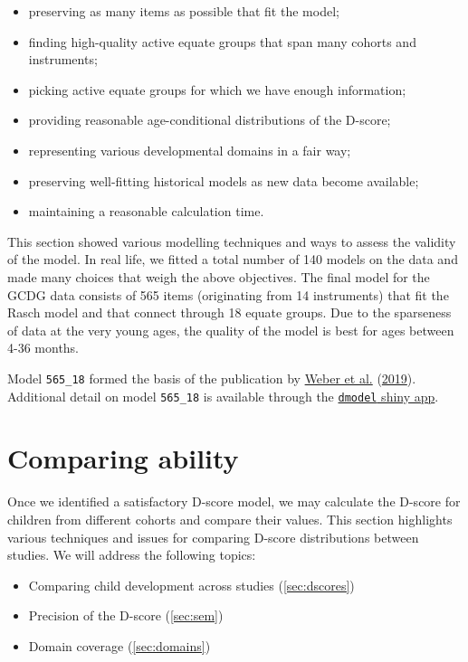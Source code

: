 \documentclass[
]{book}
\providecommand{\tightlist}{%
  \setlength{\itemsep}{0pt}\setlength{\parskip}{0pt}}
\begin{document}
\begin{itemize}
\tightlist
\item
  preserving as many items as possible that fit the model;
\item
  finding high-quality active equate groups that span many cohorts and instruments;
\item
  picking active equate groups for which we have enough information;
\item
  providing reasonable age-conditional distributions of the D-score;
\item
  representing various developmental domains in a fair way;
\item
  preserving well-fitting historical models as new data become available;
\item
  maintaining a reasonable calculation time.
\end{itemize}

This section showed various modelling techniques and ways to assess the validity of the model. In real life, we fitted a total number of 140 models on the data and made many choices that weigh the above objectives. The final model for the GCDG data consists of 565 items (originating from 14 instruments) that fit the Rasch model and that connect through 18 equate groups. Due to the sparseness of data at the very young ages, the quality of the model is best for ages between 4-36 months.

Model \texttt{565\_18} formed the basis of the publication by \protect\hyperlink{ref-Weber2019}{Weber et al.} (\protect\hyperlink{ref-Weber2019}{2019}). Additional detail on model \texttt{565\_18} is available through the \href{https://tnochildhealthstatistics.shinyapps.io/dmodel/}{\texttt{dmodel} shiny app}.

\newpage

\hypertarget{ch:ability}{%
\chapter{Comparing ability}\label{ch:ability}}

Once we identified a satisfactory D-score model, we may calculate the D-score for children from different cohorts and compare their values. This section highlights various techniques and issues for comparing D-score distributions between studies. We will address the following topics:

\begin{itemize}
\tightlist
\item
  Comparing child development across studies (\ref{sec:dscores})
\item
  Precision of the D-score (\ref{sec:sem})
\item
  Domain coverage (\ref{sec:domains})
\end{itemize}
\end{document}
